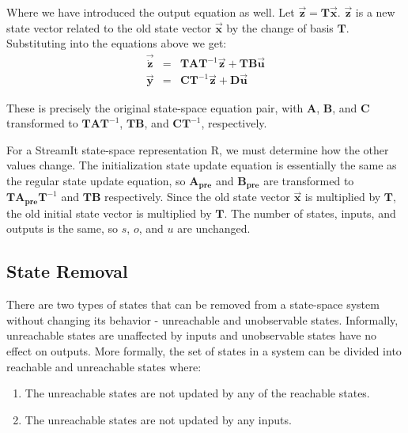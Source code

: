     Where we have introduced the output equation as well. Let
$\vec{\mathbf{z}} = \mathbf{T} \vec{\mathbf{x}}$.
$\vec{\mathbf{z}}$ is a new state vector related to the old state
vector $\vec{\mathbf{x}}$ by the change of basis $\mathbf{T}$.
Substituting into the equations above we get:
\begin{eqnarray*}
\vec{\dot{\mathbf{z}}} & = & \mathbf{TA} \mathbf{T}^{-1} \vec{\mathbf{z}} + \mathbf{TB} \vec{\mathbf{u}} \\
\vec{\mathbf{y}} & = & \mathbf{C} \mathbf{T}^{-1}\vec{\mathbf{z}}
+ \mathbf{D}\vec{\mathbf{u}}
\end{eqnarray*}

    These is precisely the original state-space equation pair,
with $\mathbf{A}$, $\mathbf{B}$, and $\mathbf{C}$ transformed to
$\mathbf{T} \mathbf{A} \mathbf{T}^{-1}$, $\mathbf{T} \mathbf{B}$,
and $\mathbf{C} \mathbf{T}^{-1}$, respectively.

    For a StreamIt state-space representation $\mathrm{R}$, we must
determine how the other values change. The initialization state
update equation is essentially the same as the regular state
update equation, so $\mathbf{A_{pre}}$ and $\mathbf{B_{pre}}$ are
transformed to $\mathbf{T} \mathbf{A_{pre}} \mathbf{T}^{-1}$ and
$\mathbf{T} \mathbf{B}$ respectively. Since the old state vector
$\vec{\mathbf{x}}$ is multiplied by $\mathbf{T}$, the old initial
state vector is multiplied by $\mathbf{T}$. The number of states,
inputs, and outputs is the same, so $s$, $o$, and $u$ are
unchanged.

\subsection{State Removal}

    There are two types of states that can be removed from a state-space system
without changing its behavior - unreachable and unobservable
states. Informally, unreachable states are unaffected by inputs
and unobservable states have no effect on outputs. More formally,
the set of states in a system can be divided into reachable and
unreachable states where:
\begin{enumerate}
\item The unreachable states are not updated by any of the
reachable states.

\item The unreachable states are not updated by any inputs.
\end{enumerate}

